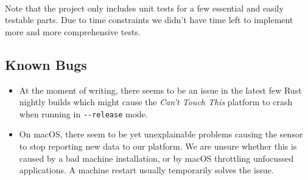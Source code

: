 \documentclass{standalone}
\begin{document}
  \paragraph{}
  Note that the project only includes unit tests for a few essential and easily
  testable parts. Due to time constraints we didn't have time left to implement
  more and more comprehensive tests.

  \subsection{Known Bugs}
  \begin{itemize}
    \tightlist{}
    \item At the moment of writing, there seems to be an issue in the latest
      few Rust nightly builds which might cause the \textit{Can't Touch This}
      platform to crash when running in \verb_--release_ mode.
    \item On macOS, there seem to be yet unexplainable problems causing the sensor
      to stop reporting new data to our platform. We are unsure whether this is
      caused by a bad machine installation, or by macOS throttling unfocussed
      applications. A machine restart usually temporarily solves the issue.
  \end{itemize}

  \clearpage
\end{document}
